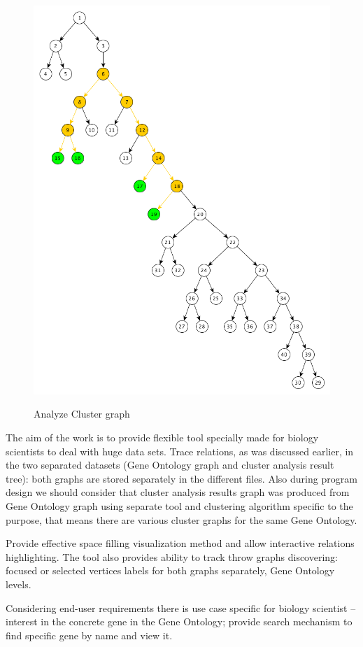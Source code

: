 \begin{figure}[h!]
{    \includegraphics[scale=0.23]{pictures/subgraph_extraction_algorithm_step_5.png}
}
\caption{Analyze Cluster graph}
\end{figure}


The aim of the work is to provide flexible tool specially made for biology scientists to deal with huge data sets. Trace relations, as was discussed earlier, in the two separated datasets (Gene Ontology graph and cluster analysis result tree): both graphs are stored separately in the different files. Also during program design we should consider that cluster analysis results graph was produced from Gene Ontology graph using separate tool and clustering algorithm specific to the purpose, that means there are various cluster graphs for the same Gene Ontology.

Provide effective space filling visualization method and allow interactive relations highlighting. The tool also provides ability to track throw graphs discovering: focused or selected vertices labels for both graphs separately, Gene Ontology levels. 

Considering end-user requirements there is use case specific for biology scientist -- interest in the concrete gene in the Gene Ontology; provide search mechanism to find specific gene by name and view it.